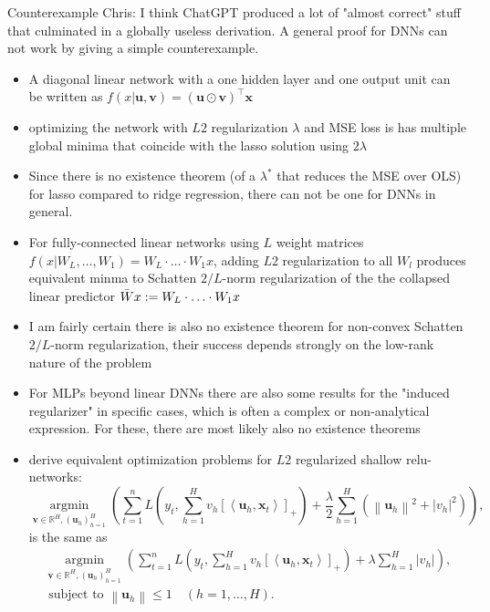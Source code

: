 \documentclass[11pt,compress,t,notes=noshow, xcolor=table]{beamer}
\begin{document}
\begin{vbframe}{Counterexample}
Chris: I think ChatGPT produced a lot of "almost correct" stuff that culminated in a globally useless derivation. A general proof for DNNs can not work by giving a simple counterexample.
\vspace{0.2cm}
\begin{itemize}
    \item A diagonal linear network with a one hidden layer and one output unit can be written as $f(x|\bm{u},\bm{v}) = (\bm{u} \odot \bm{v})^{\top} \bm{x}$
    \item optimizing the network with $L2$ regularization $\lambda$ and MSE loss is has multiple global minima that coincide with the lasso solution using $2\lambda$
    \item Since there is no existence theorem (of a $\lambda^*$ that reduces the MSE over OLS) for lasso compared to ridge regression, there can not be one for DNNs in general.
    \item For fully-connected linear networks using $L$ weight matrices $f(x|W_L,\ldots,W_1)=W_L \cdot \ldots \cdot W_1 x$, adding $L2$ regularization to all $W_l$ produces equivalent minma to Schatten $2/L$-norm regularization of the the collapsed linear predictor $\Bar{W}x:=W_L \cdot \ldots \cdot W_1x$
    \item I am fairly certain there is also no existence theorem for non-convex Schatten $2/L$-norm regularization, their success depends strongly on the low-rank nature of the problem
    \item For MLPs beyond linear DNNs there are also some results for the "induced regularizer" in specific cases, which is often a complex or non-analytical expression. For these, there are most likely also no existence theorems
    \item {} derive equivalent optimization problems for $L2$ regularized shallow relu-networks:
    $$
\underset{\boldsymbol{v} \in \mathbb{R}^H,\left(\boldsymbol{u}_h\right)_{h=1}^H}{\operatorname{argmin}}\left(\sum_{t=1}^n L\left(y_t, \sum_{h=1}^H v_h\left[\left\langle\boldsymbol{u}_h, \boldsymbol{x}_t\right\rangle\right]_{+}\right)+\frac{\lambda}{2} \sum_{h=1}^H\left(\left\|\boldsymbol{u}_h\right\|^2+\left|v_h\right|^2\right)\right),
$$
is the same as
$$
\begin{gathered}
\underset{\boldsymbol{v} \in \mathbb{R}^H,\left(\boldsymbol{u}_h\right)_{h=1}^H}{\operatorname{argmin}}\left(\sum_{t=1}^n L\left(y_t, \sum_{h=1}^H v_h\left[\left\langle\boldsymbol{u}_h, \boldsymbol{x}_t\right\rangle\right]_{+}\right)+\lambda \sum_{h=1}^H\left|v_h\right|\right), \\
\text { subject to }\left\|\boldsymbol{u}_h\right\| \leq 1 \quad(h=1, \ldots, H) .
\end{gathered}
$$
\end{itemize}
\end{vbframe}


\endlecture
\end{document}

